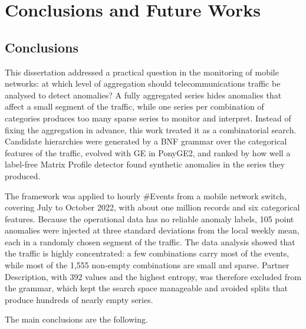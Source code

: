 \chapter{Conclusions and Future Works}
\label{chap:conclusions}

\section{Conclusions}

This dissertation addressed a practical question in the monitoring of mobile networks: at which level of aggregation should telecommunications traffic be analysed to detect anomalies?
A fully aggregated series hides anomalies that affect a small segment of the traffic, while one series per combination of categories produces too many sparse series to monitor and interpret.
Instead of fixing the aggregation in advance, this work treated it as a combinatorial search.
Candidate hierarchies were generated by a \ac{BNF} grammar over the categorical features of the traffic, evolved with \ac{GE} in PonyGE2, and ranked by how well a label-free Matrix Profile detector found synthetic anomalies in the series they produced.

The framework was applied to hourly \#Events from a mobile network switch, covering July to October 2022, with about one million records and six categorical features.
Because the operational data has no reliable anomaly labels, 105 point anomalies were injected at three standard deviations from the local weekly mean, each in a randomly chosen segment of the traffic.
The data analysis showed that the traffic is highly concentrated: a few combinations carry most of the events, while most of the 1{,}555 non-empty combinations are small and sparse.
Partner Description, with 392 values and the highest entropy, was therefore excluded from the grammar, which kept the search space manageable and avoided splits that produce hundreds of nearly empty series.

The main conclusions are the following.

